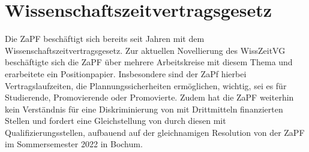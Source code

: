 \documentclass{scrartcl}
\begin{document}
	\section*{Wissenschaftszeitvertragsgesetz}
	
	Die ZaPF beschäftigt sich bereits seit Jahren mit dem Wissenschaftszeitvertragsgesetz. 
	Zur aktuellen Novellierung des WissZeitVG beschäftigte sich die ZaPF über mehrere Arbeitskreise mit diesem Thema und erarbeitete ein Positionpapier. Insbesondere sind der ZaPf hierbei Vertragslaufzeiten, die Plannungssicherheiten ermöglichen, wichtig, sei es für Studierende, Promovierende oder Promovierte.
	Zudem  hat die ZaPF weiterhin kein Verständnis für eine Diskriminierung von mit Drittmitteln finanzierten Stellen und fordert eine Gleichstellung von durch diesen mit Qualifizierungsstellen, aufbauend auf der gleichnamigen Resolution von der ZaPF im Sommersemester 2022 in Bochum.\\
	
\end{document}
